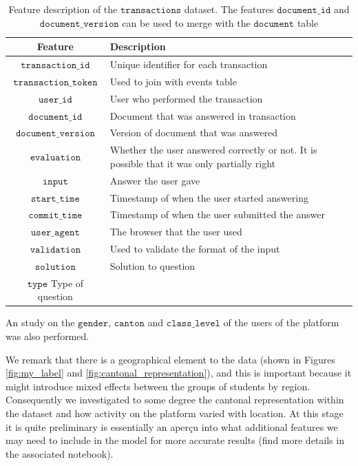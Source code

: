 \documentclass[sigplan,screen]{acmart}
\begin{document}
\begin{table}[!ht]
  \caption{Feature description of the $\texttt{transactions}$ dataset. The features $\texttt{document\_id}$ and $\texttt{document\_version}$ can be used to merge with the $\texttt{document}$ table}
  \label{tab:transactions}
  \begin{tabular}{cl}
    \toprule
    \textbf{Feature}&\textbf{Description}\\
    \midrule
    $\texttt{transaction\_id}$ & Unique identifier for each transaction \\
    $\texttt{transaction\_token}$ & Used to join with events table \\
    $\texttt{user\_id}$ & User who performed the transaction \\
    $\texttt{document\_id}$ & Document that was answered in transaction \\
    $\texttt{document\_version}$ & Version of document that was answered \\
    $\texttt{evaluation}$ & Whether the user answered correctly or not. It is possible that it was only partially right \\
    $\texttt{input}$ & Answer the user gave \\
    $\texttt{start\_time}$ & Timestamp of when the user started answering \\
    $\texttt{commit\_time}$ & Timestamp of when the user submitted the answer \\
    $\texttt{user\_agent}$ & The browser that the user used \\
    $\texttt{validation}$ & Used to validate the format of the input \\
    $\texttt{solution}$ & Solution to question \\
    $\texttt{type}$ Type of question \\
    \bottomrule
    \end{tabular}
\end{table}

An study on the $\texttt{gender}$, $\texttt{canton}$ and $\texttt{class\_level}$ of the users of the platform was also performed.

We remark that there is a geographical element to the data (shown in Figures \ref{fig:my_label} and \ref{fig:cantonal_representation}), and this is important because it might introduce mixed effects between the groups of students by region. Consequently we investigated to some degree the cantonal representation within the dataset and how activity on the platform varied with location. At this stage it is quite preliminary is essentially an aperçu into what additional features we may need to include in the model for more accurate results (find more details in the associated notebook).
\end{document}
